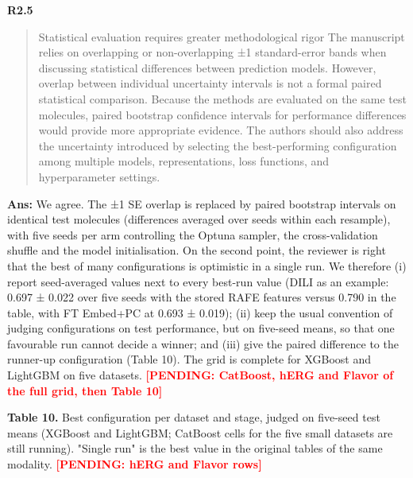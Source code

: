 \documentclass[
  10pt,
]{article}
\newcommand{\placeholder}[1]{\textcolor{red}{\textbf{[PENDING#1]}}}
\begin{document}
\textbf{R2.5}

\begin{quote}
Statistical evaluation requires greater methodological rigor The
manuscript relies on overlapping or non-overlapping ±1 standard-error
bands when discussing statistical differences between prediction models.
However, overlap between individual uncertainty intervals is not a
formal paired statistical comparison. Because the methods are evaluated
on the same test molecules, paired bootstrap confidence intervals for
performance differences would provide more appropriate evidence. The
authors should also address the uncertainty introduced by selecting the
best-performing configuration among multiple models, representations,
loss functions, and hyperparameter settings.
\end{quote}

\textbf{Ans:} We agree. The ±1 SE overlap is replaced by paired
bootstrap intervals on identical test molecules (differences averaged
over seeds within each resample), with five seeds per arm controlling
the Optuna sampler, the cross-validation shuffle and the model
initialisation. On the second point, the reviewer is right that the best
of many configurations is optimistic in a single run. We therefore (i)
report seed-averaged values next to every best-run value (DILI as an
example: 0.697 ± 0.022 over five seeds with the stored RAFE features
versus 0.790 in the table, with FT Embed+PC at 0.693 ± 0.019); (ii) keep
the usual convention of judging configurations on test performance, but
on five-seed means, so that one favourable run cannot decide a winner;
and (iii) give the paired difference to the runner-up configuration
(Table 10). The grid is complete for XGBoost and LightGBM on five
datasets. \placeholder{: CatBoost, hERG and Flavor of the full
grid, then Table 10}

\textbf{Table 10.} Best configuration per dataset and stage, judged on
five-seed test means (XGBoost and LightGBM; CatBoost cells for the five
small datasets are still running). "Single run" is the best value in the
original tables of the same modality. \placeholder{: hERG and
Flavor rows}
\end{document}
